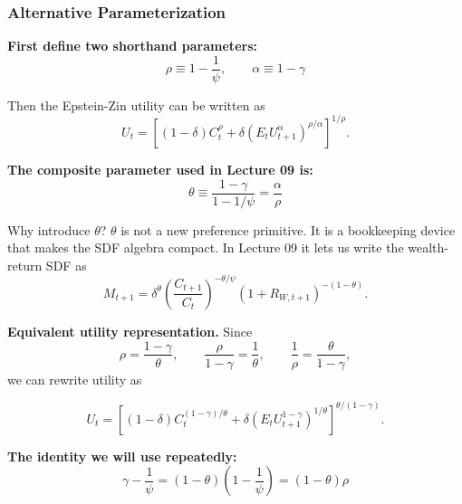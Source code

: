 \documentclass{beamer}
\begin{document}
\begin{frame}[allowframebreaks]
    \frametitle{Alternative Parameterization}
    
    \textbf{First define two shorthand parameters:}
    \begin{equation*}
        \rho \equiv 1-\frac{1}{\psi}, \qquad \alpha \equiv 1-\gamma
    \end{equation*}
    
    Then the Epstein-Zin utility can be written as
    \begin{equation*}
        U_t=\left[(1-\delta)C_t^\rho+\delta\left(E_tU_{t+1}^{\alpha}\right)^{\rho/\alpha}\right]^{1/\rho}.
    \end{equation*}
    
    \textbf{The composite parameter used in Lecture 09 is:}
    \begin{equation*}
        \boxed{\theta \equiv \frac{1-\gamma}{1-1/\psi}=\frac{\alpha}{\rho}}
    \end{equation*}
    
    \begin{block}{Why introduce $\theta$?}
        $\theta$ is not a new preference primitive. It is a bookkeeping device that makes the SDF algebra compact. In Lecture 09 it lets us write the wealth-return SDF as
        \[
        M_{t+1}=\delta^\theta\left(\frac{C_{t+1}}{C_t}\right)^{-\theta/\psi}(1+R_{W,t+1})^{-(1-\theta)}.
        \]
    \end{block}

    \framebreak

    \textbf{Equivalent utility representation.}
    Since
    \begin{equation*}
        \rho=\frac{1-\gamma}{\theta}, \qquad \frac{\rho}{1-\gamma}=\frac{1}{\theta}, \qquad \frac{1}{\rho}=\frac{\theta}{1-\gamma},
    \end{equation*}
    we can rewrite utility as
    \begin{tcolorbox}[colback=green!5!white, colframe=green!75!black, title=Equivalent Epstein-Zin Form]
    \begin{equation*}
        U_t=
        \left[
        (1-\delta)C_t^{(1-\gamma)/\theta}
        +\delta\left(E_tU_{t+1}^{1-\gamma}\right)^{1/\theta}
        \right]^{\theta/(1-\gamma)}.
    \end{equation*}
    \end{tcolorbox}

    \textbf{The identity we will use repeatedly:}
    \begin{equation*}
        \boxed{\gamma-\frac{1}{\psi}=(1-\theta)\left(1-\frac{1}{\psi}\right)=(1-\theta)\rho}
    \end{equation*}


\end{frame}
\end{document}
